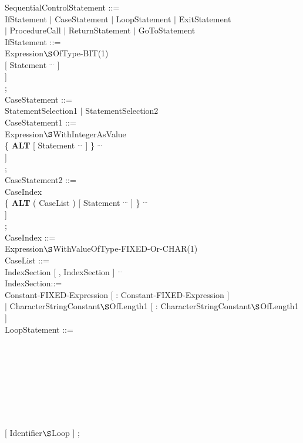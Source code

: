 SequentialControlStatement ::=\\
\x IfStatement $\mid$ CaseStatement $\mid$ LoopStatement $\mid$ ExitStatement\\
\x $\mid$ ProcedureCall $\mid$ ReturnStatement $\mid$ GoToStatement\\

IfStatement ::=\\
 Expression$\S $OfType-BIT(1)\\
\x {} [ Statement $^{...}$ ]\\ 
\x \x [ {\bf ELSE} [ Statement $^{...}$ ] ]\\
 ;\\

CaseStatement ::=\\
\x StatementSelection1 $\mid$ StatementSelection2\\

CaseStatement1 ::=\\
 Expression$\S $WithIntegerAsValue\\
\x \x \{ {\bf ALT} [ Statement $^{...}$ ] \} $^{...}$\\
\x \x [ {\bf OUT} [ Statement $^{...}$ ] ]\\
 ;\\

CaseStatement2 ::=\\
 CaseIndex\\
\x \x \{ {\bf ALT} ( CaseList ) [ Statement $^{...}$ ] \} $^{...}$\\
\x \x [ {\bf OUT} [ Statement $^{...}$ ] ]\\
 ;\\

CaseIndex ::=\\
\x Expression$\S $WithValueOfType-FIXED-Or-CHAR(1)\\

CaseList ::=\\
\x IndexSection [ , IndexSection ] $^{...}$\\

IndexSection::=\\
\x Constant-FIXED-Expression [ : Constant-FIXED-Expression ]\\
\x $\mid$ CharacterStringConstant$\S $OfLength1 [ : CharacterStringConstant$\S $OfLength1 ]\\

LoopStatement ::=\\
\\
\\
\\
\\
\\
\\
\x {}\\ 
\x \x [ Statement $^{...}$ ] \\
 [ Identifier$\S $Loop ] ;\\
        
